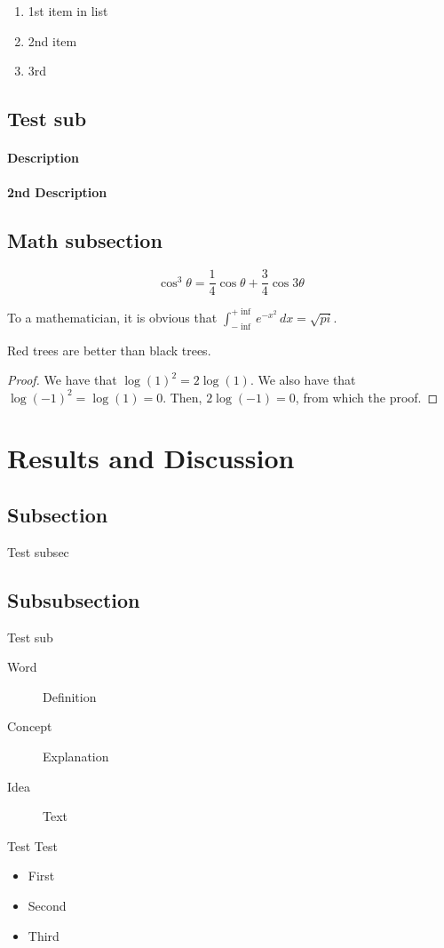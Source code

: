 \documentclass[10pt, 
a4paper, 
oneside, 
headinclude, footinclude, 
BCOR5mm]
{scrartcl}
\begin{document}
\begin{enumerate}
    \item 1st item in list
    \item 2nd item 
    \item 3rd
\end{enumerate}

\subsection{Test sub}

\paragraph{Description}
\paragraph{2nd Description}

\subsection{Math subsection}

\begin{equation}
    \cos^3 \theta = \frac{1}{4}\cos\theta + \frac{3}{4}\cos 3\theta
    \label{eq:refname2}
\end{equation}

\begin{definition}[Gauss]
    To a mathematician, it is obvious that
    $\int_{-\inf}^{+\inf} e^{-x^2}\, dx=\sqrt{pi}$.
\end{definition}

\begin{theorem}
    Red trees are better than black trees.
\end{theorem}

\begin{proof}
    We have that $\log(1)^2 = 2\log(1)$.
    We also have that $\log(-1)^2 = \log(1) = 0$.
    Then, $2\log(-1) = 0$, from which the proof.
\end{proof}

\section{Results and Discussion}

\subsection{Subsection}
Test subsec

\subsection{Subsubsection}
Test sub

\begin{description}
    \item[Word] Definition
    \item[Concept] Explanation
    \item[Idea] Text
\end{description}

Test Test

\begin{itemize}[noitemsep]
    \item First
    \item Second
    \item Third
\end{itemize}
\end{document}
